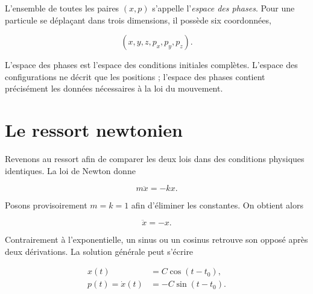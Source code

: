 L’ensemble de toutes les paires \((x,p)\) s’appelle l’\emph{espace des phases}. Pour une particule se déplaçant dans trois dimensions, il possède six coordonnées,

\begin{equation}
  (x,y,z,p_x,p_y,p_z).
  \label{eq:one-particle-phase-space}
\end{equation}

L’espace des phases est l’espace des conditions initiales complètes. L’espace des configurations ne décrit que les positions ; l’espace des phases contient précisément les données nécessaires à la loi du mouvement.

\begin{classroomqa}\end{classroomqa}

\section{Le ressort newtonien}

Revenons au ressort afin de comparer les deux lois dans des conditions physiques identiques. La loi de Newton donne

\begin{equation}
  m\ddot x=-kx.
  \label{eq:newton-spring}
\end{equation}

Posons provisoirement \(m=k=1\) afin d’éliminer les constantes. On obtient alors

\begin{equation}
  \ddot x=-x.
  \label{eq:normalized-oscillator}
\end{equation}

Contrairement à l’exponentielle, un sinus ou un cosinus retrouve son opposé après deux dérivations. La solution générale peut s’écrire

\begin{align}
  x(t)&=C\cos(t-t_0),
  \label{eq:oscillator-x}\\
  p(t)=\dot x(t)&=-C\sin(t-t_0).
  \label{eq:oscillator-p}
\end{align}

